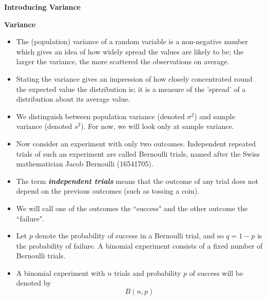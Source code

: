 \documentclass[]{report}
\begin{document}


\noindent \textbf{Introducing Variance}





\noindent \textbf{Variance}


\begin{itemize}
	
	\item The (population) variance of a random variable is a non-negative number which gives an idea of how widely spread the values are likely to be; the larger the variance, the more scattered the observations on average.
	
	\item Stating the variance gives an impression of how closely concentrated round the expected value the distribution is; it is a measure of the 'spread' of a distribution about its average value.
	
	\item We distinguish between population variance (denoted $\sigma^2$) and sample variance (denoted $s^2$). For now, we will look only at sample variance.
	
\end{itemize}


\begin{itemize}
	\item Now consider an experiment with only two outcomes. Independent repeated trials of such an experiment are
	called Bernoulli trials, named after the Swiss mathematician Jacob Bernoulli (16541705). \item The term \textbf{\emph{independent
			trials}} means that the outcome of any trial does not depend on the previous outcomes (such as tossing a coin).
	\item We will call one of the outcomes the ``success" and the other outcome the ``failure".
\end{itemize}



\begin{itemize} \item
	Let $p$ denote the probability of success in a Bernoulli trial, and so $q = 1 - p$ is the probability of failure.
	A binomial experiment consists of a fixed number of Bernoulli trials. \item A binomial experiment with $n$ trials and
	probability $p$ of success will be denoted by
	\[B(n, p)\]
\end{itemize}
\end{document}
